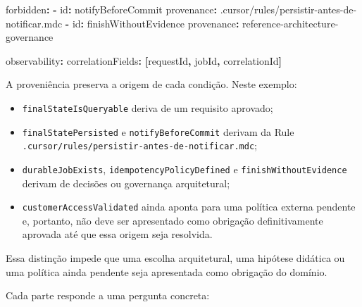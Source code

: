 \documentclass[
  10pt,
  a4paper,
  oneside]{book}
\newenvironment{Shaded}{}{}
\newcommand{\AttributeTok}[1]{\textcolor[rgb]{0.49,0.56,0.16}{#1}}
\newcommand{\FunctionTok}[1]{\textcolor[rgb]{0.02,0.16,0.49}{#1}}
\newcommand{\KeywordTok}[1]{\textcolor[rgb]{0.00,0.44,0.13}{\textbf{#1}}}
\providecommand{\tightlist}{%
  \setlength{\itemsep}{0pt}\setlength{\parskip}{0pt}}
\renewenvironment{Shaded}{\begin{snugshade}}{\end{snugshade}}%
\begin{document}
\begin{Shaded}
\begin{Highlighting}[]
\FunctionTok{forbidden}\KeywordTok{:}
\AttributeTok{  }\KeywordTok{{-}}\AttributeTok{ }\FunctionTok{id}\KeywordTok{:}\AttributeTok{ notifyBeforeCommit}
\AttributeTok{    }\FunctionTok{provenance}\KeywordTok{:}\AttributeTok{ .cursor/rules/persistir{-}antes{-}de{-}notificar.mdc}
\AttributeTok{  }\KeywordTok{{-}}\AttributeTok{ }\FunctionTok{id}\KeywordTok{:}\AttributeTok{ finishWithoutEvidence}
\AttributeTok{    }\FunctionTok{provenance}\KeywordTok{:}\AttributeTok{ reference{-}architecture{-}governance}

\FunctionTok{observability}\KeywordTok{:}
\AttributeTok{  }\FunctionTok{correlationFields}\KeywordTok{:}\AttributeTok{ }\KeywordTok{[}\AttributeTok{requestId}\KeywordTok{,}\AttributeTok{ jobId}\KeywordTok{,}\AttributeTok{ correlationId}\KeywordTok{]}
\end{Highlighting}
\end{Shaded}

A proveniência preserva a origem de cada condição. Neste exemplo:

\begin{itemize}
\tightlist
\item
  \texttt{finalStateIsQueryable} deriva de um requisito aprovado;
\item
  \texttt{finalStatePersisted} e \texttt{notifyBeforeCommit} derivam da
  Rule \texttt{.cursor/rules/persistir-antes-de-notificar.mdc};
\item
  \texttt{durableJobExists}, \texttt{idempotencyPolicyDefined} e
  \texttt{finishWithoutEvidence} derivam de decisões ou governança
  arquitetural;
\item
  \texttt{customerAccessValidated} ainda aponta para uma política
  externa pendente e, portanto, não deve ser apresentado como obrigação
  definitivamente aprovada até que essa origem seja resolvida.
\end{itemize}

Essa distinção impede que uma escolha arquitetural, uma hipótese
didática ou uma política ainda pendente seja apresentada como obrigação
do domínio.

Cada parte responde a uma pergunta concreta:
\end{document}
